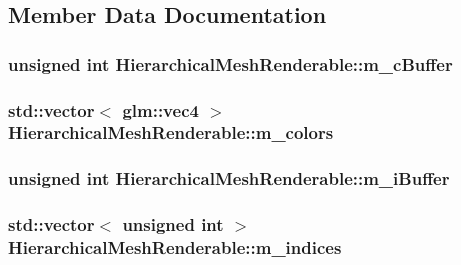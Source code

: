 \subsection{Member Data Documentation}
\hypertarget{classHierarchicalMeshRenderable_a25985832ff7ad2ec41d818ba48190722}{
\subsubsection[{m\+\_\+c\+Buffer}]{\setlength{\rightskip}{0pt plus 5cm}unsigned int Hierarchical\+Mesh\+Renderable\+::m\+\_\+c\+Buffer\hspace{0.3cm}{\ttfamily [private]}}}\label{classHierarchicalMeshRenderable_a25985832ff7ad2ec41d818ba48190722}
\hypertarget{classHierarchicalMeshRenderable_abcca72b5ae0157f6e9b23f3647939091}{
\subsubsection[{m\+\_\+colors}]{\setlength{\rightskip}{0pt plus 5cm}std\+::vector$<$ glm\+::vec4 $>$ Hierarchical\+Mesh\+Renderable\+::m\+\_\+colors\hspace{0.3cm}{\ttfamily [private]}}}\label{classHierarchicalMeshRenderable_abcca72b5ae0157f6e9b23f3647939091}
\hypertarget{classHierarchicalMeshRenderable_aaecf88387b5e1d8fe5c0d16bf5a7f6ab}{
\subsubsection[{m\+\_\+i\+Buffer}]{\setlength{\rightskip}{0pt plus 5cm}unsigned int Hierarchical\+Mesh\+Renderable\+::m\+\_\+i\+Buffer\hspace{0.3cm}{\ttfamily [private]}}}\label{classHierarchicalMeshRenderable_aaecf88387b5e1d8fe5c0d16bf5a7f6ab}
\hypertarget{classHierarchicalMeshRenderable_a07550075b3137838436b798d2a772092}{
\subsubsection[{m\+\_\+indices}]{\setlength{\rightskip}{0pt plus 5cm}std\+::vector$<$ unsigned int $>$ Hierarchical\+Mesh\+Renderable\+::m\+\_\+indices\hspace{0.3cm}{\ttfamily [private]}}}\label{classHierarchicalMeshRenderable_a07550075b3137838436b798d2a772092}
